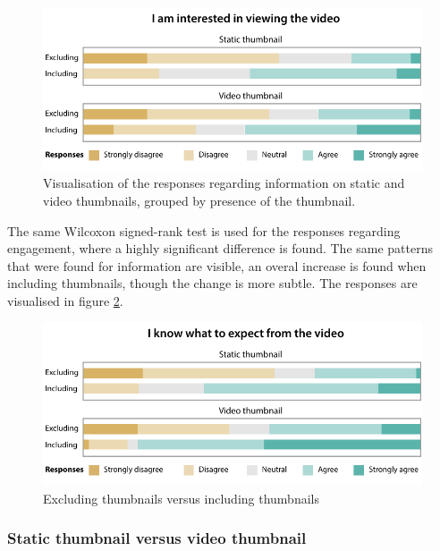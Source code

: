 \documentclass{../resources/sig-alternate-05-2015}
\begin{document}
\begin{figure}[h]
	\includegraphics[width=\linewidth]{resources/engagement_including_excluding}
	\caption{Visualisation of the responses regarding information on static and video thumbnails, grouped by presence of the thumbnail.}
	\label{figure:engagement including excluding}
\end{figure}


The same Wilcoxon signed-rank test is used for the responses regarding engagement, where a highly significant difference is found. The same patterns that were found for information are visible, an overal increase is found when including thumbnails, though the change is more subtle. The responses are visualised in figure \ref{figure:information including excluding}.

\begin{figure}[h]
	\includegraphics[width=\linewidth]{resources/information_including_excluding}
	\caption{Excluding thumbnails versus including thumbnails}
	\label{figure:information including excluding}
\end{figure}


\subsubsection{Static thumbnail versus video thumbnail}
\end{document}
